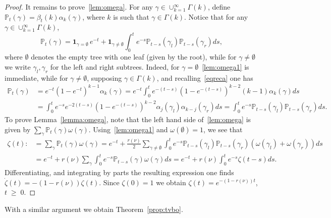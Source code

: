 \documentclass[AHL,Unicode,longabstracts,published]{cedram}
\renewcommand{\geq}{\;\geqslant\;}
\newcommand{\ind}{\mathbf{1}}
\newcommand{\bbP}{\mathbb{P}}
\let\a=\alpha
\let\b=\beta
\let\g=\gamma
\let\o=\omega
\let\z=\zeta
\let\G=\Gamma
\begin{document}
\begin{proof}
It remains to prove~\eqref{lem:omega}. For any $\g\in\cup_{k=1}^\infty\G(k)$, define $\bbP_t(\g) = \b_t(k)\alpha_k(\g)$, where $k$ is such that $\g\in\G(k)$. Notice that for any $\g\in\cup_{k=1}^\infty\G(k)$,
\begin{equation}\label{lem:omega1}
\bbP_t(\g) = \ind_{\g=\emptyset}\,e^{-t} + \ind_{\g\neq \emptyset}\int_0^t e^{-s}\bbP_{t-s}(\g_l)\bbP_{t-s}(\g_r)ds,
\end{equation}
where $\emptyset$ denotes the empty tree with one leaf (given by the root), while for $\g\neq \emptyset$ we write $\g_l,\g_r$ for the left and right subtrees. Indeed, for $\g=\emptyset$~\eqref{lem:omega1} is immediate, while for $\g\neq\emptyset$, supposing $\g\in\G(k)$, and recalling~\eqref{eqreca} one has
\begin{align*}
\bbP_{t}(\g) &= e^{-t}\left(1-e^{-t}\right)^{k-1}\a_k(\g) = e^{-t}\int_0^{t}e^{-(t-s)}\left(1-e^{-(t-s)}\right)^{k-2}(k-1)\a_k(\g)ds\\ &=
\int_0^t e^{-s}e^{-2(t-s)}\left(1-e^{-(t-s)}\right)^{k-2}\a_j(\g_l)\a_{k-j}(\g_r)ds =\int_0^t e^{-s} \bbP_{t-s}(\g_l)\bbP_{t-s}(\g_r)ds.
\end{align*}
To prove Lemma~\ref{lemma:omega}, note that the left hand side of~\eqref{lem:omega} is given by $\sum_\g \bbP_t(\g)\o(\g)$. Using~\eqref{lem:omega1} and $\o(\emptyset)=1$, we see that
\begin{align*}
\z(t):&=\sum_\g\bbP_{t}(\g)\o(\g) =e^{-t} +\frac{r(\nu)}2
\sum_{\g\neq\emptyset}\int_0^t e^{-s} \bbP_{t-s}(\g_l)\bbP_{t-s}(\g_r)(\o(\g_l)+\o(\g_r))ds\\
&=e^{-t} +r(\nu)
\sum_{\g}\int_0^t e^{-s} \bbP_{t-s}(\g)\o(\g)ds=e^{-t} +r(\nu)
\int_0^t e^{-s} \z(t-s)ds.
\end{align*}
Differentiating, and integrating by parts the resulting expression one finds $\dot\z(t) = -(1-r(\nu))\z(t)$. Since $\z(0)=1$ we obtain $\z(t)=e^{-(1-r(\nu))t}$, $t\geq 0$.
\end{proof}



With a similar argument we obtain Theorem~\ref{prop:tvbo}.
\end{document}
